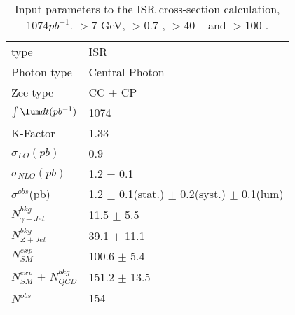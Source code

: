 \documentclass[12pt,twoside,letterpaper]{article}
\begin{document}
   \begin{table}[!hbtp]                                                 
      \begin{center}                                                    
      \begin{tabular}{|l|l|}\hline \hline                         
 	   \Zg type       &ISR           \\ 
       Photon type        &  Central Photon           \\ 
       Zee type        &  CC + CP           \\ 
   \hline 
 	   $\int \lum dt(pb^{-1})$         & 1074          \\ 
   	   K-Factor                   & 1.33                 \\ 
   	   $\sigma_{LO}(pb)$         & 0.9           \\ 
 	   $\sigma_{NLO}(pb)$        & 1.2 $\pm$ 0.1                  \\ 
   \hline 
 $\sigma^{obs}$(pb)  &   1.2 $\pm$ 0.1(stat.)  $\pm$ 0.2(syst.)  $\pm$ 0.1(lum)   \\ 
   \hline 
   \hline 
 $N^{bkg}_{\gamma+Jet}$     &           11.5 $\pm$ 5.5\\ 
  $N^{bkg}_{Z+Jet}$     &           39.1 $\pm$ 11.1\\ 
          $N^{exp}_{SM}$&          100.6 $\pm$ 5.4\\ 
 $N^{exp}_{SM}$ + $N^{bkg}_{QCD}$     &          151.2 $\pm$ 13.5\\ 
   \hline 
               $N^{obs}$&            154\\ 
	 \hline\hline                                                                
      \end{tabular}                                                             
      \end{center}                                                              
      \caption{Input parameters to the ISR \eeg cross-section calculation, 1074$pb^{-1}$. \Etg $> 7$ GeV, \DeltaR $> 0.7$ , \Mee $> 40$ \GeVCC~ and \Meeg $> 100$ \GeVCC. }  
      \label{Table:eegAcceptanceISR1fb}                                                        
   \end{table}                                                                  
\end{document}
